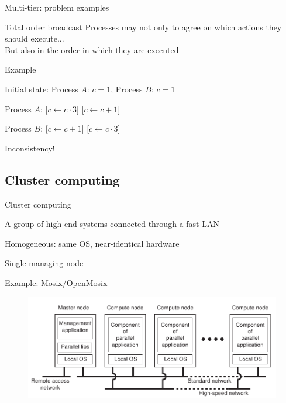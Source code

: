 \begin{frame}{Multi-tier: problem examples}
	
\begin{block}{Total order broadcast}
Processes may not only to agree on which actions they should execute...\\
But also in the order in which they are executed
\end{block}

\bigskip
Example
\BI
\item Initial state: Process $A$: $c=1$, Process $B$: $c=1$
\item Process $A$: [$c \gets c \cdot 3$] [$c \gets c+1$]
\item Process $B$: [$c \gets c+1$] [$c \gets c \cdot 3$]
\item Inconsistency! 
\EI
\end{frame}

\subsection{Cluster computing}

\begin{frame}{Cluster computing}
	
\BI
\item A group of high-end systems connected through a fast LAN
\item Homogeneous: same OS, near-identical hardware
\item Single managing node
\item Example: Mosix/OpenMosix
\EI

\begin{figure}
\includegraphics[width=\textwidth]{cluster.png}	
\end{figure}

\end{frame}

